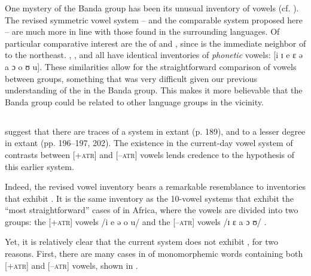 \documentclass[output=paper,colorlinks,citecolor=brown]{langscibook}
\begin{document}
One mystery of the Banda  group has been its unusual inventory of vowels (cf. ). The revised symmetric  vowel system  -- and the comparable  system proposed here -- are much more in line with those found in the surrounding languages. Of particular comparative interest are the  of  and , since  is the immediate neighbor of  to the northeast. , , and  all have identical inventories of \textit{phonetic} vowels: [i ɪ e ɛ ə a ɔ o ʊ u]. These similarities allow for the straightforward comparison of vowels between groups, something that was very difficult given our previous understanding of the  in the Banda  group. This makes it more believable that the Banda  group could be related to other language groups in the vicinity.

\subsection{}

\citeauthor{BoyeldieuCloarec-Heiss2001} suggest that there are traces of a   system in extant  (p. 189), and to a lesser degree in extant  (pp. 196–197, 202). The existence in the current-day  vowel system of contrasts between [+\textsc{atr}] and [–\textsc{atr}] vowels lends credence to the hypothesis of this earlier  system.

Indeed, the revised  vowel inventory bears a remarkable resemblance to inventories that exhibit . It is the same inventory as the 10-vowel systems that exhibit the “most straightforward” cases of  in Africa, where the vowels are divided into two groups: the [+\textsc{atr}] vowels /i e ə o u/ and the [–\textsc{atr}] vowels /ɪ ɛ a ɔ ʊ/ \citep[499]{Casali2008}.

Yet, it is relatively clear that the current  system does not exhibit , for two reasons. First, there are many cases in  of monomorphemic words containing both [+\textsc{atr}] and [–\textsc{atr}] vowels, shown in .
\end{document}
